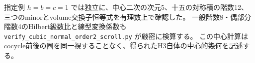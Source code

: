 指定例 $h=b=c=1$ では独立に、中心二次の次元5、十五の対称積の階数12、
三つのminorとvolume交換子恒等式を有理数上で確認した。
一般階数8・偶部分階数4のHilbert級数比と線型変換係数も
\texttt{verify\_cubic\_normal\_order2\_scroll.py} が厳密に検算する。
この中心計算はcocycle前後の圏を同一視することなく、得られたH3自体の中心的幾何を記述する。
